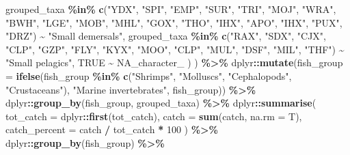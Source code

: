 \documentclass[
]{book}
\newenvironment{Shaded}{\begin{snugshade}}{\end{snugshade}}
\newcommand{\AttributeTok}[1]{\textcolor[rgb]{0.13,0.29,0.53}{#1}}
\newcommand{\ConstantTok}[1]{\textcolor[rgb]{0.56,0.35,0.01}{#1}}
\newcommand{\DecValTok}[1]{\textcolor[rgb]{0.00,0.00,0.81}{#1}}
\newcommand{\FunctionTok}[1]{\textcolor[rgb]{0.13,0.29,0.53}{\textbf{#1}}}
\newcommand{\NormalTok}[1]{#1}
\newcommand{\SpecialCharTok}[1]{\textcolor[rgb]{0.81,0.36,0.00}{\textbf{#1}}}
\newcommand{\StringTok}[1]{\textcolor[rgb]{0.31,0.60,0.02}{#1}}
\begin{document}
\begin{Shaded}
\begin{Highlighting}[]
\NormalTok{      grouped\_taxa }\SpecialCharTok{\%in\%} \FunctionTok{c}\NormalTok{(}\StringTok{"YDX"}\NormalTok{, }\StringTok{"SPI"}\NormalTok{, }\StringTok{"EMP"}\NormalTok{, }\StringTok{"SUR"}\NormalTok{, }\StringTok{"TRI"}\NormalTok{, }\StringTok{"MOJ"}\NormalTok{, }\StringTok{"WRA"}\NormalTok{, }\StringTok{"BWH"}\NormalTok{, }\StringTok{"LGE"}\NormalTok{, }\StringTok{"MOB"}\NormalTok{, }\StringTok{"MHL"}\NormalTok{, }\StringTok{"GOX"}\NormalTok{, }\StringTok{"THO"}\NormalTok{, }\StringTok{"IHX"}\NormalTok{, }\StringTok{"APO"}\NormalTok{, }\StringTok{"IHX"}\NormalTok{, }\StringTok{"PUX"}\NormalTok{, }\StringTok{"DRZ"}\NormalTok{) }\SpecialCharTok{\textasciitilde{}} \StringTok{"Small demersals"}\NormalTok{,}
\NormalTok{      grouped\_taxa }\SpecialCharTok{\%in\%} \FunctionTok{c}\NormalTok{(}\StringTok{"RAX"}\NormalTok{, }\StringTok{"SDX"}\NormalTok{, }\StringTok{"CJX"}\NormalTok{, }\StringTok{"CLP"}\NormalTok{, }\StringTok{"GZP"}\NormalTok{, }\StringTok{"FLY"}\NormalTok{, }\StringTok{"KYX"}\NormalTok{, }\StringTok{"MOO"}\NormalTok{, }\StringTok{"CLP"}\NormalTok{, }\StringTok{"MUL"}\NormalTok{, }\StringTok{"DSF"}\NormalTok{, }\StringTok{"MIL"}\NormalTok{, }\StringTok{"THF"}\NormalTok{) }\SpecialCharTok{\textasciitilde{}} \StringTok{"Small pelagics"}\NormalTok{,}
      \ConstantTok{TRUE} \SpecialCharTok{\textasciitilde{}} \ConstantTok{NA\_character\_}
\NormalTok{    )}
\NormalTok{  ) }\SpecialCharTok{\%\textgreater{}\%}
\NormalTok{  dplyr}\SpecialCharTok{::}\FunctionTok{mutate}\NormalTok{(}\AttributeTok{fish\_group =} \FunctionTok{ifelse}\NormalTok{(fish\_group }\SpecialCharTok{\%in\%} \FunctionTok{c}\NormalTok{(}\StringTok{"Shrimps"}\NormalTok{, }\StringTok{"Molluscs"}\NormalTok{, }\StringTok{"Cephalopods"}\NormalTok{, }\StringTok{"Crustaceans"}\NormalTok{), }\StringTok{"Marine invertebrates"}\NormalTok{, fish\_group)) }\SpecialCharTok{\%\textgreater{}\%}
\NormalTok{  dplyr}\SpecialCharTok{::}\FunctionTok{group\_by}\NormalTok{(fish\_group, grouped\_taxa) }\SpecialCharTok{\%\textgreater{}\%}
\NormalTok{  dplyr}\SpecialCharTok{::}\FunctionTok{summarise}\NormalTok{(}
    \AttributeTok{tot\_catch =}\NormalTok{ dplyr}\SpecialCharTok{::}\FunctionTok{first}\NormalTok{(tot\_catch),}
    \AttributeTok{catch =} \FunctionTok{sum}\NormalTok{(catch, }\AttributeTok{na.rm =}\NormalTok{ T),}
    \AttributeTok{catch\_percent =}\NormalTok{ catch }\SpecialCharTok{/}\NormalTok{ tot\_catch }\SpecialCharTok{*} \DecValTok{100}
\NormalTok{  ) }\SpecialCharTok{\%\textgreater{}\%}
\NormalTok{  dplyr}\SpecialCharTok{::}\FunctionTok{group\_by}\NormalTok{(fish\_group) }\SpecialCharTok{\%\textgreater{}\%}

\end{Highlighting}
\end{Shaded}
\end{document}
